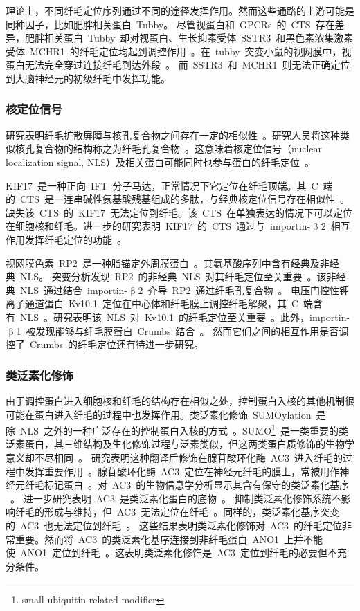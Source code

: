 理论上，不同纤毛定位序列通过不同的途径发挥作用。然而这些通路的上游可能是同种因子，比如肥胖相关蛋白\ Tubby。 尽管视蛋白和\ GPCRs\ 的\ CTS\ 存在差异，肥胖相关蛋白\ Tubby\ 却对视蛋白、生长抑素受体\ SSTR3\ 和黑色素浓集激素受体\ MCHR1\ 的纤毛定位均起到调控作用\ \citep{Sun2012}。在\ tubby\ 突变小鼠的视网膜中，视蛋白无法完全穿过连接纤毛到达外段\
\citep{Sun2012}。 而\ SSTR3\ 和\ MCHR1\ 则无法正确定位到大脑神经元的初级纤毛中发挥功能\citep{Sun2012}。

\subsubsection{核定位信号}
研究表明纤毛扩散屏障与核孔复合物之间存在一定的相似性\ \citep{Huang2010}。研究人员将这种类似核孔复合物的结构称之为纤毛孔复合物\ \citep{Kee2013}。这意味着核定位信号（nuclear localization signal, NLS）及相关蛋白可能同时也参与蛋白的纤毛定位\ \citep{Huang2010}。

KIF17\ 是一种正向\ IFT\ 分子马达，正常情况下它定位在纤毛顶端。其\ C\ 端的\ CTS\ 是一连串碱性氨基酸残基组成的多肽，与经典核定位信号存在相似性\ \citep{Dishinger2010}。缺失该\ CTS\ 的\ KIF17\ 无法定位到纤毛。该\ CTS\ 在单独表达的情况下可以定位在细胞核和纤毛。进一步的研究表明\ KIF17\ 的\ CTS\ 通过与\ importin-$\upbeta$2\ 相互作用发挥纤毛定位的功能\
\citep{Dishinger2010}。

视网膜色素\ RP2\ 是一种脂锚定外周膜蛋白\ \citep{Hurd2011}。其氨基酸序列中含有经典及非经典\ NLS。 突变分析发现\ RP2\ 的非经典\ NLS\ 对其纤毛定位至关重要\ \citep{Hurd2011}。该非经典\ NLS\ 通过结合\ importin-$\upbeta$2\ 介导\ RP2\ 通过纤毛孔复合物\
\citep{Hurd2011}。 电压门控性钾离子通道蛋白\ Kv10.1\ 定位在中心体和纤毛膜上调控纤毛解聚，其\ C\ 端含有\ NLS\
\citep{Sanchez2016,Chen2011}。研究表明该\ NLS\ 对\ Kv10.1\ 的纤毛定位至关重要\
\citep{Sanchez2016}。此外，importin-$\upbeta$1\ 被发现能够与纤毛膜蛋白\ Crumbs\ 结合\ \citep{Fan2007}。 然而它们之间的相互作用是否调控了\ Crumbs\ 的纤毛定位还有待进一步研究\citep{Fan2007}。

\subsubsection{类泛素化修饰}
由于调控蛋白进入细胞核和纤毛的结构存在相似之处，控制蛋白入核的其他机制很可能在蛋白进入纤毛的过程中也发挥作用。类泛素化修饰\ SUMOylation\ 是除\ NLS\ 之外的一种广泛存在的控制蛋白入核的方式\
\citep{Zhang2002,Chen2006}。SUMO\footnote{small ubiquitin-related modifier}\ 是一类重要的类泛素蛋白，其三维结构及生化修饰过程与泛素类似，但这两类蛋白质修饰的生物学意义却不尽相同\ \citep{Hay2005}。 研究表明这种翻译后修饰在腺苷酸环化酶\ AC3\
进入纤毛的过程中发挥重要作用\ \citep{McIntyre2015}。腺苷酸环化酶\ AC3\ 定位在神经元纤毛的膜上，常被用作神经元纤毛标记蛋白\ \citep{Bishop2007}。对\ AC3\ 的生物信息学分析显示其含有保守的类泛素化基序
\ \citep{McIntyre2015}。 进一步研究表明\ AC3\ 是类泛素化蛋白的底物\ \citep{McIntyre2015}。 抑制类泛素化修饰系统不影响纤毛的形成与维持，但\ AC3\
无法定位在纤毛\ \citep{McIntyre2015}。同样的，类泛素化基序突变的\ AC3\
也无法定位到纤毛\ \citep{McIntyre2015}。 这些结果表明类泛素化修饰对\ AC3\ 的纤毛定位非常重要。然而将\ AC3\
的类泛素化基序连接到非纤毛蛋白\ ANO1\
上并不能使\ ANO1\
定位到纤毛\ \citep{McIntyre2015}。这表明类泛素化修饰是\ AC3\
定位到纤毛的必要但不充分条件。

